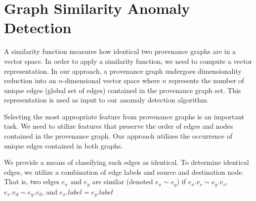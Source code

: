 

\section{Graph Similarity Anomaly Detection}

A similarity function measures how identical two provenance graphs are in a vector space. In order to apply a similarity function, we need to compute a vector representation. In our approach, a provenance graph undergoes dimensionality reduction into an $n$-dimensional vector space where $n$ represents the number of unique edges (global set of edges) contained in the provenance graph set. This representation is used as input to our anomaly detection algorithm. \par Selecting the most appropriate feature from provenance graphs is an important task. We need to utilize features that preserve the order of edges and nodes contained in the provenance graph. Our approach utilizes the occurrence of unique edges contained in both graphs.  

\par We provide a means of classifying such edges as identical. To determine identical edges, we utilize a combination of edge labels and source and destination node. That is, two edges $e_x $ and $e_y$ are similar (denoted $e_x \sim e_y$) if $e_x.v_s \sim e_y.v_s$, $e_x.v_d \sim e_y.v_d$, and $e_x.label = e_y.label$  


